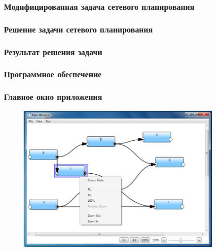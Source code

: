 \documentclass[12pt]{beamer}
\begin{document}
\begin{frame}
  \frametitle{Модифицированная задача сетевого планирования}
\end{frame}

\begin{frame}
  \frametitle{Решение задачи сетевого планирования}
\end{frame}

\begin{frame}
  \frametitle{Результат решения задачи}
\end{frame}

\begin{frame}
  \frametitle{Программное обеспечение}
\end{frame}

\begin{frame}
  \frametitle{Главное окно приложения}
  \begin{figure}
    \center
    \includegraphics[width=0.9\textwidth]{app-sample-graph.png}
  \end{figure}
\end{frame}



\end{document}
